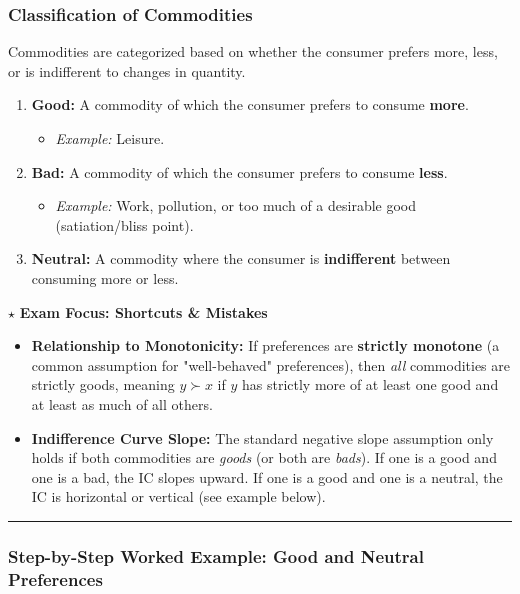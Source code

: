 \documentclass{article}
\begin{document}
\subsubsection*{Classification of Commodities}

Commodities are categorized based on whether the consumer prefers more, less, or is indifferent to changes in quantity.

\begin{enumerate}
    \item \textbf{Good:} A commodity of which the consumer prefers to consume \textbf{more}.
    \begin{itemize}
        \item \textit{Example:} Leisure.
    \end{itemize}
    \item \textbf{Bad:} A commodity of which the consumer prefers to consume \textbf{less}.
    \begin{itemize}
        \item \textit{Example:} Work, pollution, or too much of a desirable good (satiation/bliss point).
    \end{itemize}
    \item \textbf{Neutral:} A commodity where the consumer is \textbf{indifferent} between consuming more or less.
\end{enumerate}

\noindent $\star$ \textbf{Exam Focus: Shortcuts \& Mistakes}

\begin{itemize}
    \item \textbf{Relationship to Monotonicity:} If preferences are \textbf{strictly monotone} (a common assumption for "well-behaved" preferences), then \textit{all} commodities are strictly goods, meaning $y \succ x$ if $y$ has strictly more of at least one good and at least as much of all others.
    \item \textbf{Indifference Curve Slope:} The standard negative slope assumption only holds if both commodities are \textit{goods} (or both are \textit{bads}). If one is a good and one is a bad, the IC slopes upward. If one is a good and one is a neutral, the IC is horizontal or vertical (see example below).
\end{itemize}

\noindent\rule{\linewidth}{0.4pt}

\subsubsection*{Step-by-Step Worked Example: Good and Neutral Preferences}
\end{document}

